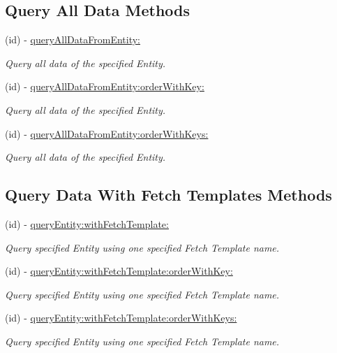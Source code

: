 \subsection*{Query All Data Methods}
\begin{DoxyCompactItemize}
\item 
(id) -\/ \hyperlink{interface_j_p_d_b_manager_action_a367267b639633531a6e44c6b7857cfd0}{queryAllDataFromEntity:}
\begin{DoxyCompactList}\small\item\em Query all data of the specified Entity. \item\end{DoxyCompactList}\item 
(id) -\/ \hyperlink{interface_j_p_d_b_manager_action_a41146d672b6282be3eb7ef37dffe17d0}{queryAllDataFromEntity:orderWithKey:}
\begin{DoxyCompactList}\small\item\em Query all data of the specified Entity. \item\end{DoxyCompactList}\item 
(id) -\/ \hyperlink{interface_j_p_d_b_manager_action_ad26a0af6246a53d8497178371308e28d}{queryAllDataFromEntity:orderWithKeys:}
\begin{DoxyCompactList}\small\item\em Query all data of the specified Entity. \item\end{DoxyCompactList}\end{DoxyCompactItemize}
\subsection*{Query Data With Fetch Templates Methods}
\begin{DoxyCompactItemize}
\item 
(id) -\/ \hyperlink{interface_j_p_d_b_manager_action_a37853bbac86c15f62981187bd9d7bcfc}{queryEntity:withFetchTemplate:}
\begin{DoxyCompactList}\small\item\em Query specified Entity using one specified Fetch Template name. \item\end{DoxyCompactList}\item 
(id) -\/ \hyperlink{interface_j_p_d_b_manager_action_aa857b7593c614e34728ba1c346774e47}{queryEntity:withFetchTemplate:orderWithKey:}
\begin{DoxyCompactList}\small\item\em Query specified Entity using one specified Fetch Template name. \item\end{DoxyCompactList}\item 
(id) -\/ \hyperlink{interface_j_p_d_b_manager_action_ac9cc8404e73e1cb38ce0cc50cbac3ecd}{queryEntity:withFetchTemplate:orderWithKeys:}
\begin{DoxyCompactList}\small\item\em Query specified Entity using one specified Fetch Template name. \item\end{DoxyCompactList}\end{DoxyCompactItemize}
